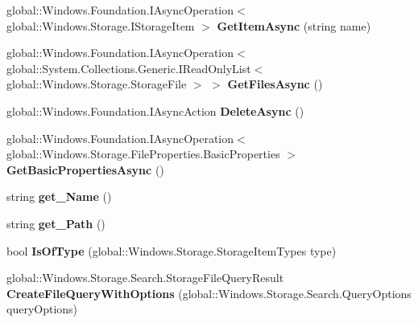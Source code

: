 \begin{DoxyCompactItemize}
global\+::\+Windows.\+Foundation.\+I\+Async\+Operation$<$ global\+::\+Windows.\+Storage.\+I\+Storage\+Item $>$ {\bfseries Get\+Item\+Async} (string name)
\item 
\mbox{\label{class_windows_1_1_storage_1_1_storage_folder_a03d5948527bd8ff44b485ba99e4fd723}} 
global\+::\+Windows.\+Foundation.\+I\+Async\+Operation$<$ global\+::\+System.\+Collections.\+Generic.\+I\+Read\+Only\+List$<$ global\+::\+Windows.\+Storage.\+Storage\+File $>$ $>$ {\bfseries Get\+Files\+Async} ()
\item 
\mbox{\label{class_windows_1_1_storage_1_1_storage_folder_ae60237b6aa50f6820009b4332c8abd48}} 
global\+::\+Windows.\+Foundation.\+I\+Async\+Action {\bfseries Delete\+Async} ()
\item 
\mbox{\label{class_windows_1_1_storage_1_1_storage_folder_ae9c02355139ce9e4530065b3ddfb717f}} 
global\+::\+Windows.\+Foundation.\+I\+Async\+Operation$<$ global\+::\+Windows.\+Storage.\+File\+Properties.\+Basic\+Properties $>$ {\bfseries Get\+Basic\+Properties\+Async} ()
\item 
\mbox{\label{class_windows_1_1_storage_1_1_storage_folder_a722592bfe76cdbc6678e09dca477b4fc}} 
string {\bfseries get\+\_\+\+Name} ()
\item 
\mbox{\label{class_windows_1_1_storage_1_1_storage_folder_a3c76cae5d410f07ee9f03d979f1b81f8}} 
string {\bfseries get\+\_\+\+Path} ()
\item 
\mbox{\label{class_windows_1_1_storage_1_1_storage_folder_aa385666b1143c539c3b9d8bbb270e8d1}} 
bool {\bfseries Is\+Of\+Type} (global\+::\+Windows.\+Storage.\+Storage\+Item\+Types type)
\item 
\mbox{\label{class_windows_1_1_storage_1_1_storage_folder_a61bb687dd56eb8dc8b62c6d031f10c42}} 
global\+::\+Windows.\+Storage.\+Search.\+Storage\+File\+Query\+Result {\bfseries Create\+File\+Query\+With\+Options} (global\+::\+Windows.\+Storage.\+Search.\+Query\+Options query\+Options)

\end{DoxyCompactItemize}
